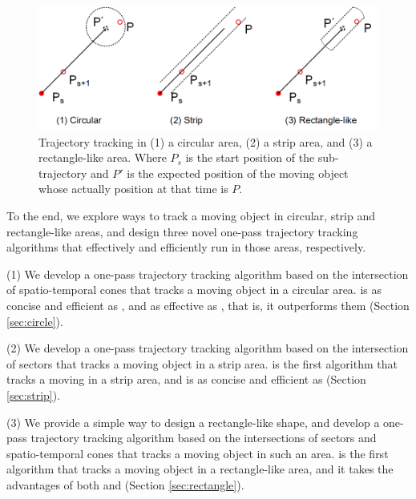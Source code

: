 \begin{figure}[tb!]
	\centering
	\includegraphics[scale=1.0]{Figures/Fig-Areas.png}\vspace{-1ex}
	\caption{\small  Trajectory tracking in (1) a circular area, (2) a strip area, and (3) a rectangle-like area. Where $P_s$ is the start position of the sub-trajectory and $P'$ is the expected position of the moving object whose actually position at that time is $P$.}
	\vspace{-1ex}
	\label{fig:areas}
\end{figure}

To the end, we explore ways to track a moving object in circular, strip and rectangle-like areas, and design three novel one-pass trajectory tracking algorithms that effectively and efficiently run in those areas, respectively. 

\ni (1) We develop a one-pass trajectory tracking algorithm \citt based on the intersection of spatio-temporal cones that tracks a moving object in a circular area. \citt is as concise and efficient as \ldrh, and as effective as \grts, that is, it outperforms them (Section \ref{sec:circle}).

\ni (2) We develop a one-pass trajectory tracking algorithm \sitt based on the intersection of sectors that tracks a moving object in a strip area. \sitt is the first algorithm that tracks a moving in a strip area, and is as concise and efficient as \citt (Section \ref{sec:strip}). %

\ni (3) We provide a simple way to design a rectangle-like shape, and develop a one-pass trajectory tracking algorithm \bitt based on the intersections of sectors and spatio-temporal cones that tracks a moving object in such an area. \bitt is the first algorithm that tracks a moving object in a rectangle-like area, and it takes the advantages of both \citt and \sitt (Section \ref{sec:rectangle}). 

